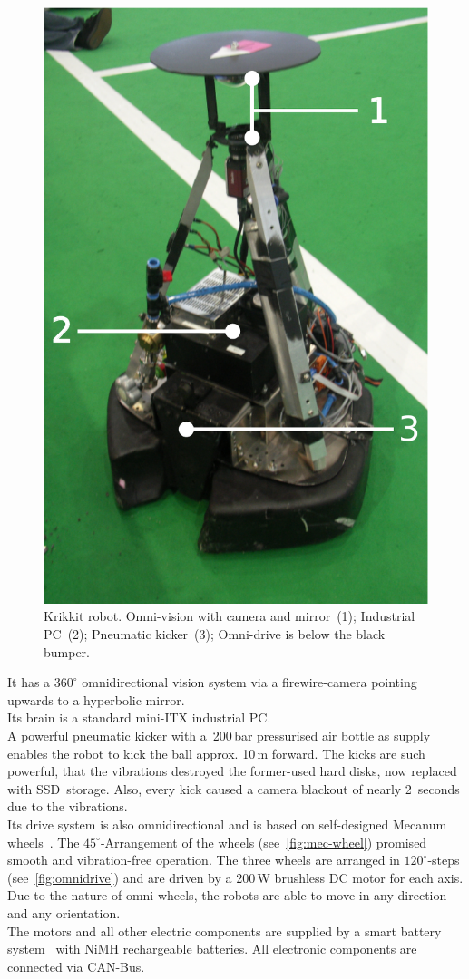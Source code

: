 \documentclass[12pt,a4paper]{article}
\begin{document}
\begin{figure}[ht]
\begin{center}
\includegraphics[width=0.5\columnwidth]{figures/krikkit.pdf}
\caption{\label{fig:krikkit}
Krikkit robot. Omni-vision with camera and mirror~(1); Industrial PC~(2); Pneumatic kicker~(3); Omni-drive is below the black bumper.
}
\end{center}
\end{figure}

It has a $360^\circ$ omnidirectional vision system via a firewire-camera pointing upwards to a hyperbolic mirror.\\
Its brain is a standard mini-ITX industrial PC.\\
A powerful pneumatic kicker with a~200\,bar pressurised air bottle as supply enables the robot to kick the ball approx. 10\,m forward.
The kicks are such powerful, that the vibrations destroyed the former-used hard disks, now replaced with SSD~storage.
Also, every kick caused a camera blackout of nearly 2~seconds due to the vibrations.\\
Its drive system is also omnidirectional and is based on self-designed Mecanum wheels~\cite{mecanum2007}. 
The $45^\circ$-Arrangement of the wheels (see~\autoref{fig:mec-wheel}) promised smooth and vibration-free operation.
The three wheels are arranged in $120^\circ$-steps (see~\autoref{fig:omnidrive}) and are driven by a 200\,W brushless DC motor for each axis.
Due to the nature of omni-wheels, the robots are able to move in any direction and any orientation.\\
The motors and all other electric components are supplied by a smart battery system~\cite{krammer06} with NiMH rechargeable batteries.
All electronic components are connected via CAN-Bus.
\end{document}
